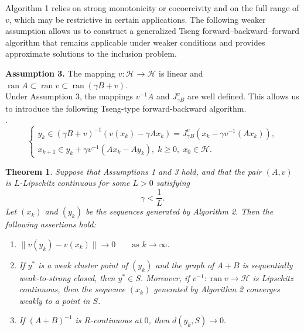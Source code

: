 \documentclass[11pt]{article}
\newtheorem{theorem}{Theorem}[section]
\theoremstyle{definition}
\theoremstyle{definition}
\theoremstyle{definition}
\newcommand{\ran}{\ensuremath{\operatorname{ran}}}
\newcommand{\tcb}{\textcolor{blue}}
\newcommand{\tcr}{\textcolor{red}}
\def\tcb{ \textcolor{blue}}
\def\tcr{ \textcolor{red}}
\begin{document}
Algorithm 1 relies on strong monotonicity or cocoercivity and on the full range of $v$, which may be restrictive in certain applications. The following weaker assumption allows us to construct a generalized Tseng forward–backward–forward algorithm that remains applicable under weaker conditions and provides approximate solutions to the inclusion problem.

%
%
\noindent \textbf{Assumption 3.} The mapping $v:\mathcal{H}\to\mathcal{H}$ is linear %
and $\ran  A\subset  \ran v\subset \ran (\gamma B+v)$. \\

{Under Assumption 3, the mappings $v^{-1}A$ and $J_{\gamma B}^v$ are well defined. This allows us to introduce the following Tseng-type forward-backward algorithm.}\\

.
\[
\begin{cases}
y_{k}\in (\gamma B+v)^{-1}(v(x_k)-\gamma Ax_k)=J^v_{\gamma B}(x_k-\gamma v^{-1}(Ax_k)),\\
x_{k+1}\in y_k+\gamma v^{-1}(Ax_k-Ay_k), \;k\ge 0, \;x_0\in \mathcal{H}.
\end{cases}
\]

\medskip
\begin{theorem}\label{thm4}
Suppose that Assumptions 1 and 3 hold, and that the pair $(A,v)$ is $L$-Lipschitz continuous for some $L>0$ satisfying
$$
\gamma<\frac{1}{L}.
$$
Let $(x_k)$ and $(y_k)$ be the sequences generated by Algorithm 2. Then the following assertions hold:
\begin{enumerate}
\item
$
\|v(y_k)-v(x_k)\|\to0\qquad\text{as }k\to\infty.
$

\item If $y^*$ is a weak cluster point of $(y_k)$ and the graph of $A+B$ is sequentially weak-to-strong closed, then $y^*\in S$. Moreover, if $v^{-1}:\operatorname{ran}v\to\mathcal{H}$ is Lipschitz continuous, then the sequence $(x_k)$ generated by Algorithm 2 converges weakly to a point in $S$.

\item If $(A+B)^{-1}$ is $R$-continuous at $0$, then
$
d(y_k,S)\to0.
$
\end{enumerate}
\end{theorem}
\end{document}
